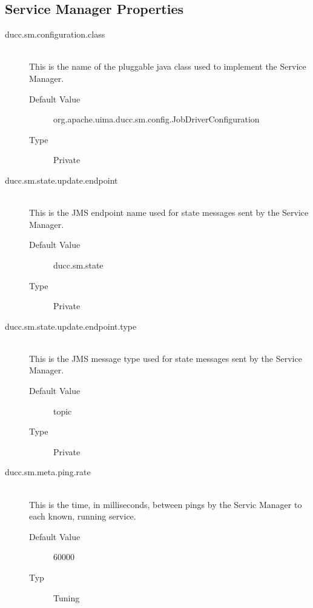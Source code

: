 \subsection{Service Manager Properties}
    \begin{description}

      \item[ducc.sm.configuration.class] \hfill \\
        This is the name of the pluggable java class used to implement the Service Manager. 
        \begin{description}
          \item[Default Value] org.apache.uima.ducc.sm.config.JobDriverConfiguration 
          \item[Type] Private 
        \end{description}
        
      \item[ducc.sm.state.update.endpoint] \hfill \\
        This is the JMS endpoint name used for state messages sent by the Service Manager. 
        \begin{description}
          \item[Default Value] ducc.sm.state 
          \item[Type] Private
        \end{description}
        
      \item[ducc.sm.state.update.endpoint.type] \hfill \\
        This is the JMS message type used for state messages sent by the Service Manager. 
        \begin{description}
          \item[Default Value] topic 
          \item[Type] Private 
        \end{description}          
        
      \item[ducc.sm.meta.ping.rate] \hfill \\
        This is the time, in milliseconds, between pings by the Servic Manager to each known, 
        running service. 
        \begin{description}          
          \item[Default Value] 60000 
          \item[Typ] Tuning
        \end{description} 
        

\end{description}
